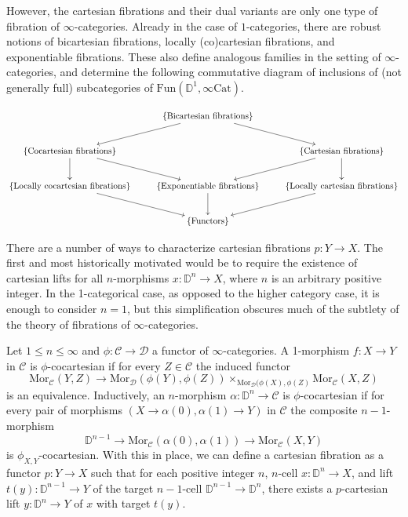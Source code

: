 \documentclass[10pt,oneside]{article}
\numberwithin{equation}{section} %
\numberwithin{figure}{section} %
\theoremstyle{plain}
\theoremstyle{definition}
\newcommand{\bD}{{\mathbb D}}
\newcommand{\mC}{{\mathcal C}}
\newcommand{\mD}{{\mathcal D}}
\newcommand{\n}{{n}}
\newcommand{\Cat}{\mathrm{Cat}}
\newcommand{\Fun}{\mathrm{Fun}}
\newcommand{\Mor}{{\mathrm{Mor}}}
\begin{document}
However, the cartesian fibrations and their dual variants are only one type of fibration of $\infty$-categories.
Already in the case of $1$-categories, there are robust notions of bicartesian fibrations, locally (co)cartesian fibrations, and exponentiable fibrations.
These also define analogous families in the setting of $\infty$-categories, and determine the following commutative diagram of inclusions of (not generally full) subcategories of $\Fun(\bD^1,\infty\Cat)$.



$$
\begin{xy}
\xymatrix{
 &   \{ {\mathrm{Bicartesian} \ \mathrm{fibrations}} \} \ar[ld]\ar[rd] &
\\
\{ \mathrm{Cocartesian} \ \mathrm{fibrations} \}  \ar[rd] \ar[d] & 
& \{ \mathrm{Cartesian} \ \mathrm{fibrations}  \} \ar[ld] \ar[d]\\
\{ {\mathrm{Locally} \ \mathrm{cocartesian} \ \mathrm{fibrations} \} } \ar[rd] & \{ \mathrm{Exponentiable} \ \mathrm{fibrations} \} \ar[d] & {\{\mathrm{Locally} \ \mathrm{cartesian} \ \mathrm{fibrations} \} }  \ar[ld] \\
& \{ \mathrm{Functors}\} &
}
\end{xy} $$




There are a number of ways to characterize cartesian fibrations $p:Y\to X$.
The first and most historically motivated would be to require the existence of cartesian lifts for all $n$-morphisms $x:\bD^n\to X$, where $n$ is an arbitrary positive integer.
In the 1-categorical case, as opposed to the higher category case, it is enough to consider $n=1$, but this simplification obscures much of the subtlety of the theory of fibrations of $\infty$-categories.

Let $1 \leq \n \leq \infty$ and $\phi: \mC \to \mD$ a functor of $\infty$-categories.
A 1-morphism $f: X \to Y$ in $\mC$ is $\phi$-cocartesian if for every $Z\in \mC$ the induced functor
$$ \Mor_\mC(Y,Z) \to \Mor_\mD(\phi(Y), \phi(Z))\times_{\Mor_\mD(\phi(X), \phi(Z)} \Mor_\mC(X,Z) $$
is an equivalence.
Inductively, an $n$-morphism $\alpha:\bD^n\to\mC$ is $\phi$-cocartesian if
for every pair of morphisms $(X \to \alpha(0), \alpha(1) \to Y)$ in $\mC$ the composite $n-1$-morphism
\[
\bD^{n-1}\to\Mor_\mC(\alpha(0),\alpha(1)) \to \Mor_\mC(X,Y)
\]
is $\phi_{X,Y}$-cocartesian.
With this in place, we can define a cartesian fibration as a functor
$p:Y\to X$ such that
for each positive integer $n$, $n$-cell $x:\bD^n\to X$, and lift $t(y):\bD^{n-1}\to Y$ of the target $n-1$-cell $\bD^{n-1}\to\bD^n$, there exists a $p$-cartesian lift $y:\bD^n\to Y$ of $x$ with target $t(y)$.
    
\end{document}
